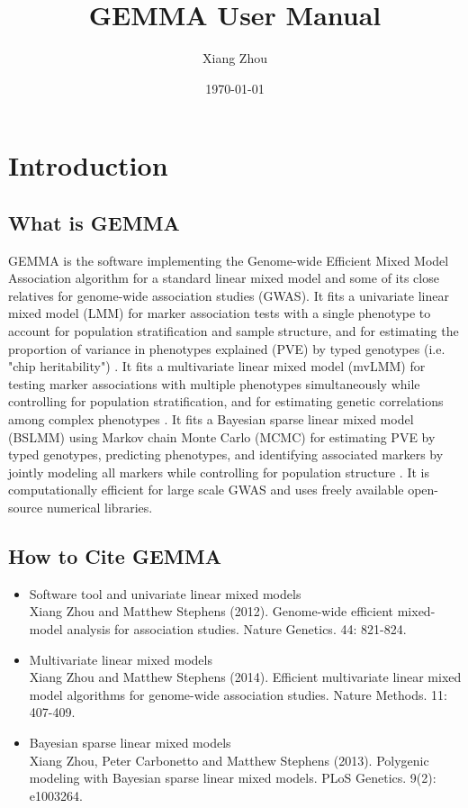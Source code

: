 \documentclass[11pt]{article}
\title{GEMMA User Manual}
\author{Xiang Zhou}
\date{\today}
\begin{document}
\maketitle

\tableofcontents

\newpage





\section{Introduction}

\subsection{What is GEMMA}
GEMMA is the software implementing the Genome-wide Efficient Mixed Model Association algorithm \cite{Zhou:2012} for a standard linear mixed model and some of its close relatives for genome-wide association studies (GWAS). It fits a univariate linear mixed model (LMM) for marker association tests with a single phenotype to account for population stratification and sample structure, and for estimating the proportion of variance in phenotypes explained (PVE) by typed genotypes (i.e. "chip heritability") \cite{Zhou:2012}.  It fits a multivariate linear mixed model (mvLMM) for testing marker associations with multiple phenotypes simultaneously while controlling for population stratification, and for estimating genetic correlations among complex phenotypes \cite{Zhou:2014}. It fits a Bayesian sparse linear mixed model (BSLMM) using Markov chain Monte Carlo (MCMC) for estimating PVE by typed genotypes, predicting phenotypes, and identifying associated markers by jointly modeling all markers while controlling for population structure \cite{Zhou:2013}. It is computationally efficient for large scale GWAS and uses freely available open-source numerical libraries.


\subsection{How to Cite GEMMA}
\begin{itemize}
\item Software tool and univariate linear mixed models \\
Xiang Zhou and Matthew Stephens (2012). Genome-wide efficient mixed-model analysis for association studies. Nature Genetics. 44: 821-824.
\item Multivariate linear mixed models \\
Xiang Zhou and Matthew Stephens (2014). Efficient multivariate linear mixed model algorithms for genome-wide association studies. Nature Methods. 11: 407-409.
\item Bayesian sparse linear mixed models \\
Xiang Zhou, Peter Carbonetto and Matthew Stephens (2013). Polygenic modeling with Bayesian sparse linear mixed models. PLoS Genetics. 9(2): e1003264.
\end{itemize}
\end{document}

